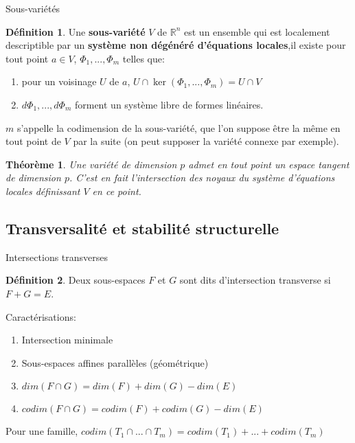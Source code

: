 \documentclass[compress]{beamer}
\newcommand{\R}{\mathbb{R}}
\newtheorem{thm}{Théorème}
\theoremstyle{definition}
\newtheorem{defn}{Définition}
\begin{document}
\begin{frame}{Sous-variétés}
    \begin{defn}
        Une \textbf{sous-variété} $V$ de $\R^n$ est un ensemble qui est localement descriptible par un \textbf{système non dégénéré d'équations locales},il existe pour tout point $a\in V$, $\Phi_1,...,\Phi_m$ telles que:
        \begin{enumerate}[<+->]
            \item pour un voisinage $U$ de $a$, $U\cap\ker(\Phi_1,...,\Phi_m)=U\cap V$
            \item $d\Phi_1,...,d\Phi_m$ forment un système libre de formes linéaires.
        \end{enumerate}

        $m$ s'appelle la codimension de la sous-variété, que l'on suppose être la même en tout point de $V$ par la suite (on peut supposer la variété connexe par exemple).
    \end{defn}
    \pause[3]
    \begin{thm}
        Une variété de dimension $p$ admet en tout point un espace tangent de dimension $p$.
        C'est en fait l'intersection des noyaux du système d'équations locales définissant $V$ en ce point.
    \end{thm}
\end{frame}

\subsection{Transversalité et stabilité structurelle}
\begin{frame}{Intersections transverses}
    \begin{defn}
        Deux sous-espaces $F$ et $G$ sont dits d'intersection transverse si $F+G=E$.
    \end{defn}
    \pause
    Caractérisations:
    \begin{enumerate}[<+->]
        \item Intersection minimale
        \item Sous-espaces affines parallèles (géométrique)
        \item $dim(F\cap G)=dim(F)+dim(G)-dim(E)$
        \item $codim(F\cap G)=codim(F)+codim(G)-dim(E)$
    \end{enumerate}
    \pause[6]
    Pour une famille, $codim(T_1\cap...\cap T_m)=codim(T_1)+...+codim(T_m)$
\end{frame}
\end{document}

